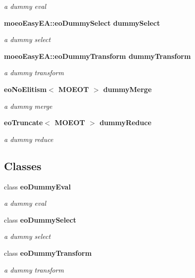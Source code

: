 \begin{CompactItemize}
\begin{CompactList}\small\item\em a dummy eval \item\end{CompactList}\item 
\bf{moeo\-Easy\-EA::eo\-Dummy\-Select} \bf{dummy\-Select}\label{classmoeoEasyEA_5bcf3894be6ed4b2d263cd2f6829029d}

\begin{CompactList}\small\item\em a dummy select \item\end{CompactList}\item 
\bf{moeo\-Easy\-EA::eo\-Dummy\-Transform} \bf{dummy\-Transform}\label{classmoeoEasyEA_cc428c9cc9c6291c32642ed5e8265de3}

\begin{CompactList}\small\item\em a dummy transform \item\end{CompactList}\item 
\bf{eo\-No\-Elitism}$<$ MOEOT $>$ \bf{dummy\-Merge}\label{classmoeoEasyEA_e26830e1301cfd626eed55b0fbf8dbcb}

\begin{CompactList}\small\item\em a dummy merge \item\end{CompactList}\item 
\bf{eo\-Truncate}$<$ MOEOT $>$ \bf{dummy\-Reduce}\label{classmoeoEasyEA_65963f9308ccc0acc3dfc32a128f6228}

\begin{CompactList}\small\item\em a dummy reduce \item\end{CompactList}\end{CompactItemize}
\subsection*{Classes}
\begin{CompactItemize}
\item 
class \bf{eo\-Dummy\-Eval}
\begin{CompactList}\small\item\em a dummy eval \item\end{CompactList}\item 
class \bf{eo\-Dummy\-Select}
\begin{CompactList}\small\item\em a dummy select \item\end{CompactList}\item 
class \bf{eo\-Dummy\-Transform}
\begin{CompactList}\small\item\em a dummy transform \item\end{CompactList}\end{CompactItemize}


